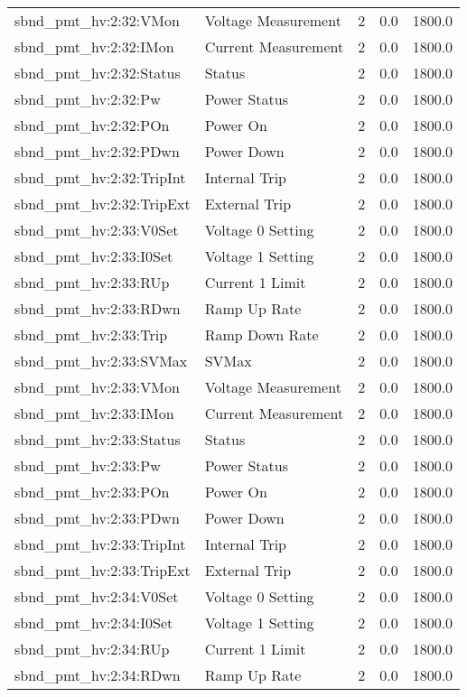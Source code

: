 \begin{center}
\begin{longtable}{l | l l l l }
sbnd\_pmt\_hv:2:32:VMon & Voltage Measurement & 2 & 0.0 & 1800.0\\ 
sbnd\_pmt\_hv:2:32:IMon & Current Measurement & 2 & 0.0 & 1800.0\\ 
sbnd\_pmt\_hv:2:32:Status & Status & 2 & 0.0 & 1800.0\\ 
sbnd\_pmt\_hv:2:32:Pw & Power Status & 2 & 0.0 & 1800.0\\ 
sbnd\_pmt\_hv:2:32:POn & Power On & 2 & 0.0 & 1800.0\\ 
sbnd\_pmt\_hv:2:32:PDwn & Power Down & 2 & 0.0 & 1800.0\\ 
sbnd\_pmt\_hv:2:32:TripInt & Internal Trip & 2 & 0.0 & 1800.0\\ 
sbnd\_pmt\_hv:2:32:TripExt & External Trip & 2 & 0.0 & 1800.0\\ 
sbnd\_pmt\_hv:2:33:V0Set & Voltage 0 Setting & 2 & 0.0 & 1800.0\\ 
sbnd\_pmt\_hv:2:33:I0Set & Voltage 1 Setting & 2 & 0.0 & 1800.0\\ 
sbnd\_pmt\_hv:2:33:RUp & Current 1 Limit & 2 & 0.0 & 1800.0\\ 
sbnd\_pmt\_hv:2:33:RDwn & Ramp Up Rate & 2 & 0.0 & 1800.0\\ 
sbnd\_pmt\_hv:2:33:Trip & Ramp Down Rate & 2 & 0.0 & 1800.0\\ 
sbnd\_pmt\_hv:2:33:SVMax & SVMax & 2 & 0.0 & 1800.0\\ 
sbnd\_pmt\_hv:2:33:VMon & Voltage Measurement & 2 & 0.0 & 1800.0\\ 
sbnd\_pmt\_hv:2:33:IMon & Current Measurement & 2 & 0.0 & 1800.0\\ 
sbnd\_pmt\_hv:2:33:Status & Status & 2 & 0.0 & 1800.0\\ 
sbnd\_pmt\_hv:2:33:Pw & Power Status & 2 & 0.0 & 1800.0\\ 
sbnd\_pmt\_hv:2:33:POn & Power On & 2 & 0.0 & 1800.0\\ 
sbnd\_pmt\_hv:2:33:PDwn & Power Down & 2 & 0.0 & 1800.0\\ 
sbnd\_pmt\_hv:2:33:TripInt & Internal Trip & 2 & 0.0 & 1800.0\\ 
sbnd\_pmt\_hv:2:33:TripExt & External Trip & 2 & 0.0 & 1800.0\\ 
sbnd\_pmt\_hv:2:34:V0Set & Voltage 0 Setting & 2 & 0.0 & 1800.0\\ 
sbnd\_pmt\_hv:2:34:I0Set & Voltage 1 Setting & 2 & 0.0 & 1800.0\\ 
sbnd\_pmt\_hv:2:34:RUp & Current 1 Limit & 2 & 0.0 & 1800.0\\ 
sbnd\_pmt\_hv:2:34:RDwn & Ramp Up Rate & 2 & 0.0 & 1800.0\\ 

\end{longtable}
\end{center}
